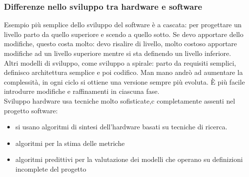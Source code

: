 \documentclass[12pt, oneside]{extbook}
\begin{document}
\subsubsection{Differenze nello sviluppo tra hardware e software}
Esempio più semplice dello sviluppo del software è a cascata: per progettare un livello parto da quello superiore e scendo a quello sotto. Se devo apportare dello modifiche, questo costa molto: devo risalire di livello, molto costoso apportare modifiche ad un livello superiore mentre si sta definendo un livello inferiore.\\ Altri modelli di sviluppo, come sviluppo a spirale: parto da requisiti semplici, definisco architettura semplice e poi codifico. Man mano andrò ad aumentare la complessità, in ogni ciclo si ottiene una versione sempre più evoluta. È più facile introdurre modifiche e raffinamenti in ciascuna fase.\\ Sviluppo hardware usa tecniche molto sofisticate,c completamente assenti nel progetto software: 
\begin{itemize}
\item si usano algoritmi di sintesi dell'hardware basati su tecniche di ricerca.
\item algoritmi per la stima delle metriche
\item algoritmi predittivi per la valutazione dei modelli che operano su definizioni incomplete del progetto
\end{itemize}
\end{document}
